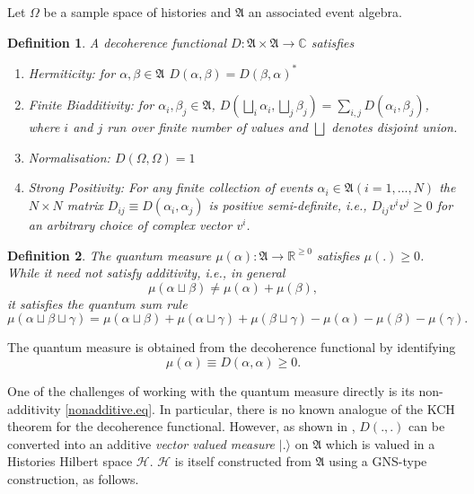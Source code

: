 \documentclass[11pt]{article}
\newtheorem*{definition}{Definition}
\newcommand{\cH}{\mathcal H}
\newcommand{\ket}[1]{| #1 \rangle}
\renewcommand{\a}{\alpha}
\renewcommand{\a }{\alpha}
\newcommand{\fA}{\mathfrak A}
\newcommand{\re}{\mathbb R}
\begin{document}
Let $\Omega$ be a sample space of histories and
$\fA$ an associated  event algebra.
\begin{definition} A {\sl decoherence functional} $D :\fA\times \fA \rightarrow \mathbb{C}$ satisfies 
\begin{enumerate}
\item Hermiticity: for $\alpha ,\beta \in \fA$ $D(\alpha ,\beta )=D(\beta ,\alpha )^*$
\item Finite Biadditivity: for $\alpha_i ,\beta_j \in \fA$,  
  $D(\bigsqcup_i\alpha_i , \bigsqcup_j \beta_j)=\sum_{i,j} D(\alpha_i
  ,\beta_j)$, where $i$ and $j$ run over finite number of values
  and $\bigsqcup$ denotes disjoint union.    
\item Normalisation: $D(\Omega ,\Omega)=1$ 
\item Strong Positivity: For any finite collection of events $\a_i \in
  \fA (i = 1,...,N)$ the $N \times N$ matrix
 $D_{ij}\equiv D(\a_i,\a_j)$ is positive semi-definite, i.e.,
 $D_{ij}v^iv^j \geq 0$ for an arbitrary choice of  complex vector $v^i$.
\end{enumerate}
\end{definition}

\begin{definition} 
The {\sl  quantum  measure}
$\mu(\alpha): \fA \rightarrow \re^{\geq 0}$ satisfies $\mu(.) \geq
0$.  While it  need not satisfy additivity, i.e., in general 
\begin{equation}
\mu (\alpha\sqcup \beta) \neq \mu (\alpha)+ \mu
(\beta),  \label{nonadditive.eq} 
\end{equation}
it satisfies the {\sl quantum sum rule} 
\begin{equation}
\mu (\alpha\sqcup \beta \sqcup \gamma) =\mu (\alpha \sqcup \beta)+\mu
(\alpha \sqcup \gamma )+\mu (\beta \sqcup \gamma)-\mu (\alpha)-\mu
(\beta)-\mu (\gamma). 
\end{equation}
\end{definition}
The quantum measure is obtained from the decoherence functional by
identifying 
\begin{equation}
  \mu(\alpha) \equiv  D(\alpha,\alpha) \geq 0. 
 \end{equation} 

 
One of the challenges of working with the quantum measure directly is
its non-additivity \eqref{nonadditive.eq}. In particular, there is no
known analogue of the KCH theorem for the decoherence
functional. However, as shown in \cite{histories,djs}, $D(.,.)$ can be
converted into an additive  {\sl  vector valued measure}
$\ket{.}$ on $\fA$ which is valued in a Histories Hilbert space
$\cH$. $\cH$ is itself 
constructed from $\fA$ using a GNS-type  construction, as follows.
\end{document}
